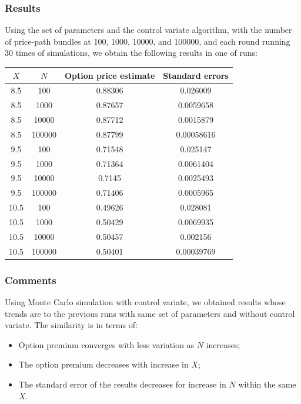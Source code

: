 \subsubsection{Results}
Using the set of parameters and the control variate algorithm, with the number of price-path bundles at 100, 1000, 10000, and 100000, and each round running 30 times of simulations, we obtain the following results in one of runs:

\begin{center}
	\begin{tabular}{| c | c | c | c |}
		\hline $X$ & $N$ & Option price estimate & Standard errors\\
		[0.5ex]
		\hline 8.5 & 100 & 0.88306 & 0.026009\\
		\hline 8.5 & 1000 & 0.87657 & 0.0059658\\
		\hline 8.5 & 10000 & 0.87712 & 0.0015879\\
		\hline 8.5 & 100000 & 0.87799 & 0.00058616\\
		\hline
		\hline 9.5 & 100 & 0.71548 & 0.025147\\
		\hline 9.5 & 1000 & 0.71364 & 0.0061404\\
		\hline 9.5 & 10000 & 0.7145 & 0.0025493\\
		\hline 9.5 & 100000 & 0.71406 & 0.0005965\\
		\hline
		\hline 10.5 & 100 & 0.49626 & 0.028081\\
		\hline 10.5 & 1000 & 0.50429 & 0.0069935\\
		\hline 10.5 & 10000 & 0.50457 & 0.002156\\
		\hline 10.5 & 100000 & 0.50401 & 0.00039769\\
		\hline
	\end{tabular}
\end{center}

\subsubsection{Comments}
Using Monte Carlo simulation with control variate, we obtained results whose trends are to the previous runs with same set of parameters and without control variate. The similarity is in terms of:
\begin{itemize}
	\item Option premium converges with less variation as $N$ increases;
	\item The option premium decreases with increase in $X$; 
	\item The standard error of the results decreases for increase in $N$ within the same $X$. 
\end{itemize}

